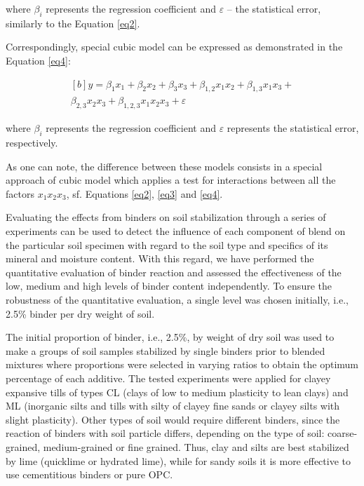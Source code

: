 \documentclass[eprint,
]{actapoly}
\begin{document}
where $\beta_i$ represents the regression coefficient and $\varepsilon$ -- the statistical error, similarly to the Equation \ref{eq2}.

Correspondingly, special cubic model can be expressed as demonstrated in the Equation \ref{eq4}:

\begin{equation}\label{eq4}
\begin{aligned}[b]
y=\beta_{1}x_{1}+\beta_{2}x_{2}+\beta_{3}x_{3}+\beta_{1,2}x_{1}x_{2}+\beta_{1,3}x_{1}x_{3}+\\\beta_{2,3}x_{2}x_{3}+\beta_{1,2,3}x_{1}x_{2}x_{3}+\varepsilon
\end{aligned}
\end{equation}

where $\beta_i$ represents the regression coefficient and $\varepsilon$ represents the statistical error, respectively. 

As one can note, the difference between these models consists in a special approach of cubic model which applies a test for interactions between all the factors $x_{1}x_{2}x_{3}$, sf. Equations \ref{eq2}, \ref{eq3} and \ref{eq4}.

Evaluating the effects from binders on soil stabilization through a series of experiments can be used to detect the influence of each component of blend on the particular soil specimen with regard to the soil type and specifics of its mineral and moisture content. With this regard, we have performed the quantitative evaluation of binder reaction and assessed the effectiveness of the low, medium and high levels of binder content independently. To ensure the robustness of the quantitative evaluation, a single level was chosen initially, i.e., 2.5\% binder per dry weight of soil. 

The initial proportion of binder, i.e., 2.5\%, by weight of dry soil was used to make a groups of soil samples stabilized by single binders prior to blended mixtures where proportions were selected in varying ratios to obtain the optimum percentage of each additive. The tested experiments were applied for clayey expansive tills of types CL (clays of low to medium plasticity to lean clays) and ML (inorganic silts and tills with silty of clayey fine sands or clayey silts with slight plasticity). Other types of soil would require different binders, since the reaction of binders with soil particle differs, depending on the type of soil: coarse-grained, medium-grained or fine grained. Thus, clay and silts are best stabilized by lime (quicklime or hydrated lime), while for sandy soils it is more effective to use cementitious binders or pure OPC.
\end{document}
